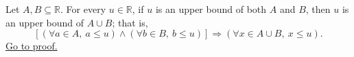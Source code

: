 \begin{lemma}
\label{lem:union-preserves-upper-bounds}
Let $A,B\subseteq\mathbb{R}$. For every $u\in\mathbb{R}$, if $u$ is an
upper bound of both $A$ and $B$, then $u$ is an upper bound of
$A\cup B$; that is,
\[
\left[
(\forall a\in A,\ a\leq u)
\land
(\forall b\in B,\ b\leq u)
\right]
\Longrightarrow
(\forall x\in A\cup B,\ x\leq u).
\]
\hyperref[prf:union-preserves-upper-bounds]{Go to proof.}
\end{lemma}
